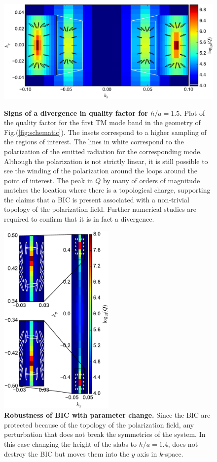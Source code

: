 \begin{figure}
\begin{minipage}{0.5\textwidth}
  \centering  
\includegraphics[width=\textwidth]{Figures/h1_5-eps-converted-to-cropped.pdf}
  \caption{{\bf Signs of a divergence in quality factor for $h/a = 1.5$.} Plot of the quality factor for the first TM mode band in the geometry of Fig.(\ref{fig:schematic}). The insets correspond to a higher sampling of the regions of interest. The lines in white correspond to the polarization of the emitted radiation for the corresponding mode. Although the polarization is not strictly linear, it is still possible to see the winding of the polarization around the loops around the point of interest. The peak in $Q$ by many of orders of magnitude matches the location where there is a topological charge, supporting the claims that a BIC is present associated with a non-trivial topology of the polarization field. Further numerical studies are required to confirm that it is in fact a divergence.}
  \label{fig:TMModes}
\end{minipage}
\begin{minipage}{0.5\textwidth}
  \centering  
\includegraphics[width=0.5\textwidth]{Figures/h1_4-eps-converted-to-cropped.pdf}
  \caption{{\bf Robustness of BIC with parameter change.} Since the BIC are protected because of the topology of the polarization field, any perturbation that does not break the symmetries of the system.  In this case changing the height of the slabs to $h/a = 1.4$, does not destroy the BIC but moves them into the $y$ axis in $k$-space.}


\end{minipage}
\end{figure}
